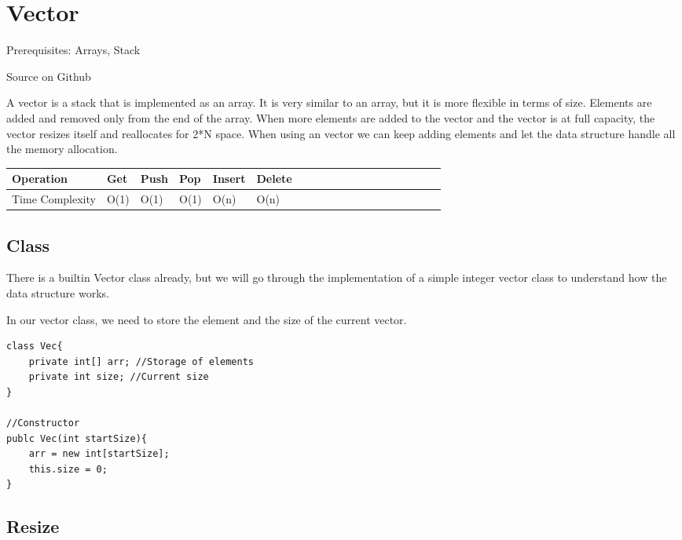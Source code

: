 \documentclass[11pt,oneside]{book}
\begin{document}
        \section{ Vector }
        

Prerequisites: Arrays, Stack

Source on Github

A vector is a stack that is implemented as an array. It is very similar to an array, but it is more flexible in terms of size. Elements are added and removed only from the end of the array. When more elements are added to the vector and the vector is at full capacity, the vector resizes itself and reallocates for 2*N space. When using an vector we can keep adding elements and let the data structure handle all the memory allocation.

\vspace{10px}\begin{tabulary}{0.4\linewidth}{|l|l|l|l|l|l|l|l|l|l|l|l|l|l|l|l|l|l|l}\hline


  Operation &
  Get &
  Push &
  Pop &
  Insert &
  Delete\\
\hline


  Time Complexity &
  O(1) &
  O(1) &
  O(1) &
  O(n) &
  O(n)\\

\hline\end{tabulary}

\subsection{Class}

There is a builtin Vector class already, but we will go through the implementation of a simple integer vector class to understand how the data structure works.

In our vector class, we need to store the element and the size of the current vector.

\begin{lstlisting}
class Vec{
    private int[] arr; //Storage of elements
    private int size; //Current size
}

//Constructor
publc Vec(int startSize){
    arr = new int[startSize];
    this.size = 0;
}

\end{lstlisting}

\subsection{Resize}
\end{document}
